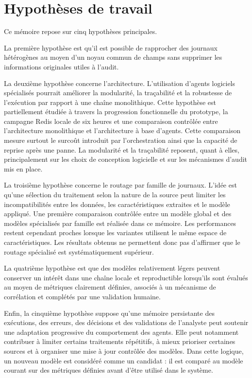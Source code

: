 \section{Hypothèses de travail}

Ce mémoire repose sur cinq hypothèses principales.

La première hypothèse est qu'il est possible de rapprocher des journaux hétérogènes au moyen d'un noyau commun de champs sans supprimer les informations originales utiles à l'audit.

La deuxième hypothèse concerne l'architecture. L'utilisation d'agents logiciels spécialisés pourrait améliorer la modularité, la traçabilité et la robustesse de l'exécution par rapport à une chaîne monolithique. Cette hypothèse est partiellement étudiée à travers la progression fonctionnelle du prototype, la campagne Redis locale de six heures et une comparaison contrôlée entre l'architecture monolithique et l'architecture à base d'agents. Cette comparaison mesure surtout le surcoût introduit par l'orchestration ainsi que la capacité de reprise après une panne. La modularité et la traçabilité reposent, quant à elles, principalement sur les choix de conception logicielle et sur les mécanismes d'audit mis en place.

La troisième hypothèse concerne le routage par famille de journaux. L'idée est qu'une sélection du traitement selon la nature de la source peut limiter les incompatibilités entre les données, les caractéristiques extraites et le modèle appliqué. Une première comparaison contrôlée entre un modèle global et des modèles spécialisés par famille est réalisée dans ce mémoire. Les performances restent cependant proches lorsque les variantes utilisent le même espace de caractéristiques. Les résultats obtenus ne permettent donc pas d'affirmer que le routage spécialisé est systématiquement supérieur.

La quatrième hypothèse est que des modèles relativement légers peuvent conserver un intérêt dans une chaîne locale et reproductible lorsqu'ils sont évalués au moyen de métriques clairement définies, associés à un mécanisme de corrélation et complétés par une validation humaine.

Enfin, la cinquième hypothèse suppose qu'une mémoire persistante des exécutions, des erreurs, des décisions et des validations de l'analyste peut soutenir une adaptation progressive du comportement des agents. Elle peut notamment contribuer à limiter certains traitements répétitifs, à mieux prioriser certaines sources et à organiser une mise à jour contrôlée des modèles. Dans cette logique, un nouveau modèle est considéré comme un candidat : il est comparé au modèle courant sur des métriques définies avant d'être utilisé dans le système.

